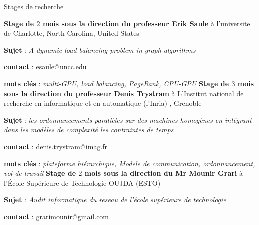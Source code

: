 \begin{rubric}{Stages de recherche}

	\textbf{Stage de $2$ mois sous la direction du professeur Erik Saule} à l’universite de Charlotte, North Carolina, United States
	\par \textbf{Sujet} : \emph{A dynamic load balancing problem in graph algorithms}
	\par \textbf{contact} : \href{mailto:esaule@uncc.edu}{esaule@uncc.edu}
	\par \textbf{mots clés} : \emph{multi-GPU, load balancing, PageRank, CPU-GPU}
%
%
	\textbf{Stage de $3$ mois sous la direction du professeur Denis Trystram} à L'Institut national de recherche en informatique et en automatique (l'Inria) , Grenoble
	\par	\textbf{Sujet} : \emph{les ordonnancements parallèles sur des machines homogènes en intégrant dans les modèles de complexité les contraintes de temps}
	\par \textbf{contact} :  \href{mailto:denis.trystram@imag.fr}{denis.trystram@imag.fr}
	\par \textbf{mots clés} : \emph{plateforme hiérarchique, Modele de communication, ordonnancement, vol de travail}
%
%
	\textbf{Stage de $2$ mois sous la direction du Mr Mounir Grari} à l’École Supérieure de Technologie OUJDA (ESTO)
	\par	\textbf{Sujet} : \emph{Audit informatique du reseau de l'école supérieure de technologie}
	\par \textbf{contact} :  \href{mailto:grarimounir@gmail.com}{grarimounir@gmail.com}
\end{rubric}

